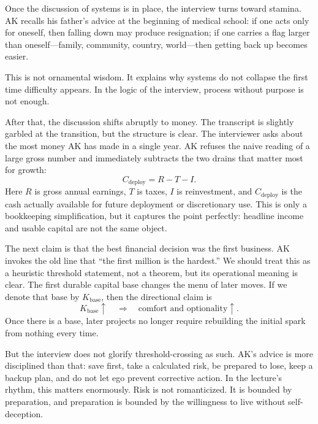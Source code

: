 Once the discussion of systems is in place, the interview turns toward stamina. AK recalls his father's advice at the beginning of medical school: if one acts only for oneself, then falling down may produce resignation; if one carries a flag larger than oneself---family, community, country, world---then getting back up becomes easier.

This is not ornamental wisdom. It explains why systems do not collapse the first time difficulty appears. In the logic of the interview, process without purpose is not enough.

After that, the discussion shifts abruptly to money. The transcript is slightly garbled at the transition, but the structure is clear. The interviewer asks about the most money AK has made in a single year. AK refuses the naive reading of a large gross number and immediately subtracts the two drains that matter most for growth:
\begin{equation}
C_{\text{deploy}} = R - T - I.
\end{equation}
Here \(R\) is gross annual earnings, \(T\) is taxes, \(I\) is reinvestment, and \(C_{\text{deploy}}\) is the cash actually available for future deployment or discretionary use. This is only a bookkeeping simplification, but it captures the point perfectly: headline income and usable capital are not the same object.

The next claim is that the best financial decision was the first business. AK invokes the old line that ``the first million is the hardest.'' We should treat this as a heuristic threshold statement, not a theorem, but its operational meaning is clear. The first durable capital base changes the menu of later moves. If we denote that base by \(K_{\text{base}}\), then the directional claim is
\begin{equation}
K_{\text{base}} \uparrow
\quad \Longrightarrow \quad
\text{comfort and optionality} \uparrow.
\end{equation}
Once there is a base, later projects no longer require rebuilding the initial spark from nothing every time.

But the interview does not glorify threshold-crossing as such. AK's advice is more disciplined than that: save first, take a calculated risk, be prepared to lose, keep a backup plan, and do not let ego prevent corrective action. In the lecture's rhythm, this matters enormously. Risk is not romanticized. It is bounded by preparation, and preparation is bounded by the willingness to live without self-deception.


